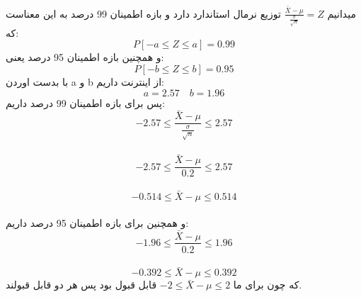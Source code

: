  \problem{}
 میدانیم $\frac{\bar{X}-\mu}{\frac{\sigma}{\sqrt{n}}} = Z$
 توزیع نرمال استاندارد دارد و بازه اطمینان 99 درصد به این معناست که:\\
 \[
    P[-a \leq Z \leq a] = 0.99    
 \]
 و همچنین بازه اطمینان 95 درصد یعنی:\\
 \[
    P[-b \leq Z \leq b] = 0.95   
 \]
 با بدست اوردن a و b از اینترنت داریم:\\
 \[
    a = 2.57 \quad b = 1.96
 \]
 پس برای بازه اطمینان 99 درصد داریم:\\
 \[
    -2.57 \leq \frac{\bar{X}-\mu}{\frac{\sigma}{\sqrt{n}}} \leq 2.57
 \]\\
 \[
    -2.57 \leq \frac{\bar{X}-\mu}{0.2} \leq 2.57
 \]\\
 \[
    -0.514 \leq \bar{X}-\mu \leq 0.514
 \]\\
 و همچنین برای بازه اطمینان 95 درصد داریم:\\
 \[
    -1.96 \leq \frac{\bar{X}-\mu}{0.2} \leq 1.96
 \]\\
 \[
    -0.392 \leq \bar{X}-\mu \leq 0.392
 \]
 که چون برای ما $-2 \leq \bar{X} - \mu \leq 2$
 قابل قبول بود پس هر دو قابل قبولند.
